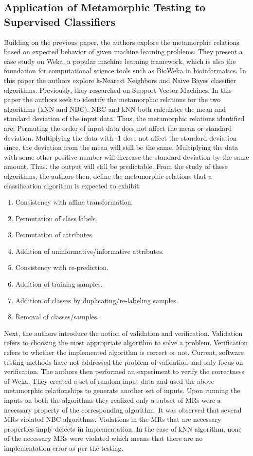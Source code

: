 \subsection{Application of Metamorphic Testing to Supervised Classifiers \cite{Xie2009}}
Building on the previous paper, the authors explore the metamorphic relations based on expected behavior of given machine learning problems. They present a case study on Weka, a popular machine learning framework, which is also the foundation for computational science tools such as BioWeka in bioinformatics. In this paper the authors explore k-Nearest Neighbors and Naive Bayes classifier algorithms. Previously, they researched on Support Vector Machines.
In this paper the authors seek to identify the metamorphic relations for the two algorithms (kNN and NBC). NBC and kNN both calculates the mean and standard deviation of the input data. Thus, the metamorphic relations identified are:
Permuting the order of input data does not affect the mean or standard deviation.
Multiplying the data with -1 does not affect the standard deviation since, the deviation from the mean will still be the same.
Multiplying the data with some other positive number will increase the standard deviation by the same amount. Thus, the output will still be predictable.
From the study of these algorithms, the authors then, define the metamorphic relations that a classification algorithm is expected to exhibit:
\begin{enumerate}
  \item Consistency with affine transformation.
  \item Permutation of class labels.
  \item Permutation of attributes.
  \item Addition of uninformative/informative attributes.
  \item Consistency with re-prediction.
  \item Addition of training samples.
  \item Addition of classes by duplicating/re-labeling samples.
  \item Removal of classes/samples.
\end{enumerate}
Next, the authors introduce the notion of validation and verification. Validation refers to choosing the most appropriate algorithm to solve a problem. Verification refers to whether the implemented algorithm is correct or not. Current, software testing methods have not addressed the problem of validation and only focus on verification.
The authors then performed an experiment to verify the correctness of Weka. They created a set of random input data and used the above metamorphic relationships to generate another set of inputs. Upon running the inputs on both the algorithms they realized only a subset of MRs were a necessary property of the corresponding algorithm. It was observed that several MRs violated NBC algorithms. Violations in the MRs that are necessary properties imply defects in implementation. In the case of kNN algorithm, none of the necessary MRs were violated which means that there are no implementation error as per the testing.

